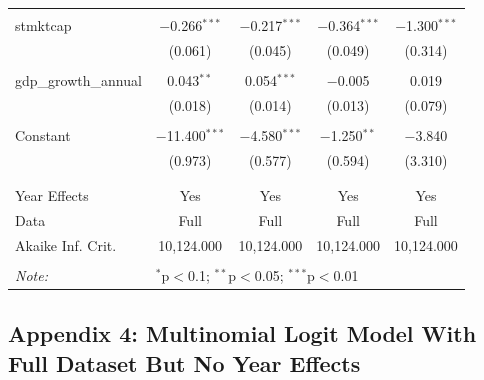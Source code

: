 \documentclass[a4paper, nobind]{templates/ociamthesis}
\begin{document}
\begin{table}[!htbp]
\begin{tabular}{@{\extracolsep{5pt}}lcccc}
  & & & & \\ 
 stmktcap & $-$0.266$^{***}$ & $-$0.217$^{***}$ & $-$0.364$^{***}$ & $-$1.300$^{***}$ \\ 
  & (0.061) & (0.045) & (0.049) & (0.314) \\ 
  & & & & \\ 
 gdp\_growth\_annual & 0.043$^{**}$ & 0.054$^{***}$ & $-$0.005 & 0.019 \\ 
  & (0.018) & (0.014) & (0.013) & (0.079) \\ 
  & & & & \\ 
 Constant & $-$11.400$^{***}$ & $-$4.580$^{***}$ & $-$1.250$^{**}$ & $-$3.840 \\ 
  & (0.973) & (0.577) & (0.594) & (3.310) \\ 
  & & & & \\ 
\hline \\[-1.8ex] 
Year Effects & Yes & Yes & Yes & Yes \\ 
Data & Full & Full & Full & Full \\ 
Akaike Inf. Crit. & 10,124.000 & 10,124.000 & 10,124.000 & 10,124.000 \\ 
\hline 
\hline \\[-1.8ex] 
\textit{Note:}  & \multicolumn{4}{l}{$^{*}$p$<$0.1; $^{**}$p$<$0.05; $^{***}$p$<$0.01} \\ 
\end{tabular} 
\end{table}

\newpage

\hypertarget{appendix-4-multinomial-logit-model-with-full-dataset-but-no-year-effects}{%
\subsection{Appendix 4: Multinomial Logit Model With Full Dataset But No Year Effects}\label{appendix-4-multinomial-logit-model-with-full-dataset-but-no-year-effects}}
\end{document}
